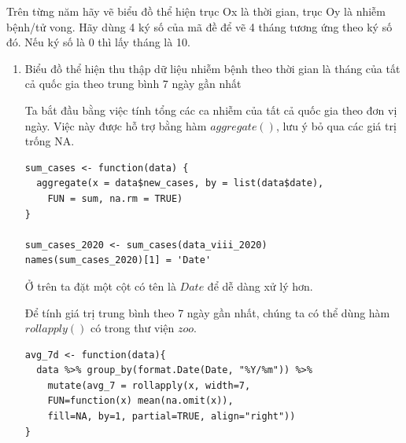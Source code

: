 \documentclass[a4paper]{article}
\theoremstyle{definition}
\begin{document}
Trên từng năm hãy vẽ biểu đồ thể hiện trục Ox là thời gian, trục Oy là nhiễm bệnh/tử vong. Hãy dùng 4 ký số của mã đề để vẽ 4 tháng tương ứng theo ký số đó. Nếu ký số là 0 thì lấy tháng là 10. 
\begin{enumerate}[1)]
    
    {\bf Xử lý chung:} Ở câu hỏi này, bài viết chỉ giới thiệu cách xử lý cho một năm là 2020, các năm 2021 và 2022 hoàn toàn tương tự.
    Đầu tiên ta sẽ trích xuất một file data để xử lý. 
    \begin{lstlisting}
data_viii <- function(year) {
  subset(dataFile, year(dataFile$date) == year & 
    (month(dataFile$date) == 1 | month(dataFile$date) == 3 | 
    month(dataFile$date) == 4 | month(dataFile$date) == 5 | 
    month(dataFile$date) == 11 | month(dataFile$date) == 12))
}

data_viii_2020 <- data_viii(2020)
    \end{lstlisting}

    \item Biểu đồ thể hiện thu thập dữ liệu nhiễm bệnh theo thời gian là tháng của tất cả quốc gia theo trung bình 7 ngày gần nhất
    
    Ta bắt đầu bằng việc tính tổng các ca nhiễm của tất cả quốc gia theo đơn vị ngày. Việc này được hỗ trợ bằng hàm $aggregate()$, lưu ý bỏ qua các giá trị trống NA.
    \begin{lstlisting}
sum_cases <- function(data) {
  aggregate(x = data$new_cases, by = list(data$date), 
    FUN = sum, na.rm = TRUE)
}

sum_cases_2020 <- sum_cases(data_viii_2020)
names(sum_cases_2020)[1] = 'Date'
    \end{lstlisting}
    
    Ở trên ta đặt một cột có tên là $Date$ để dễ dàng xử lý hơn.
    
    Để tính giá trị trung bình theo 7 ngày gần nhất, chúng ta có thể dùng hàm $rollapply()$ có trong thư viện $zoo$. 
    \begin{lstlisting}
avg_7d <- function(data){
  data %>% group_by(format.Date(Date, "%Y/%m")) %>% 
    mutate(avg_7 = rollapply(x, width=7, 
    FUN=function(x) mean(na.omit(x)), 
    fill=NA, by=1, partial=TRUE, align="right"))
}


\end{lstlisting}
\end{enumerate}
\end{document}
